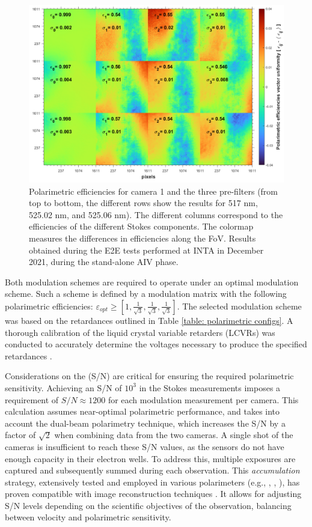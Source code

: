 \begin{figure}[t]
    \includegraphics[width=\textwidth]{figures/TuMag/Pol_efficiencies_map.png}
    \caption{Polarimetric efficiencies for camera 1 and the three pre-filters (from top to bottom, the different rows show the results for 517 nm, 525.02 nm, and 525.06 nm). The different columns correspond to the efficiencies of the different Stokes components. The colormap measures the differences in efficiencies along the FoV. Results obtained during the E2E tests performed at INTA in December 2021, during the stand-alone AIV phase. 
    \label{fig_tumag:pol eff maps}}
\end{figure}

Both modulation schemes are required to operate under an optimal modulation scheme. Such a scheme is defined by a modulation matrix with the following polarimetric efficiencies: $\varepsilon _{opt} \geqslant [1, \frac{1}{\sqrt{3}}, \frac{1}{\sqrt{3}}, \frac{1}{\sqrt{3}}]$. The selected modulation scheme was based on the retardances outlined in Table \ref{table: polarimetric configs}. A thorough calibration of the liquid crystal variable retarders (LCVRs) was conducted to accurately determine the voltages necessary to produce the specified retardances \citep{fine-tunin}.

Considerations on the (S/N) are critical for ensuring the required polarimetric sensitivity. Achieving an S/N of $10^3$ in the Stokes measurements imposes a requirement of $S/N \approx 1200$  for each modulation measurement per camera. This calculation assumes near-optimal polarimetric performance, and takes into account the dual-beam polarimetry technique, which increases the S/N by a factor of $\sqrt{2}$ when combining data from the two cameras. A single shot of the cameras is insufficient to reach these S/N values, as the sensors do not have enough capacity in their electron wells. To address this, multiple exposures are captured and subsequently summed during each observation. This \textit{accumulation} strategy, extensively tested and employed in various polarimeters (e.g., \citealt{accs1}, \citealt{accs2}, \citealt{accs3}), has proven compatible with image reconstruction techniques \citep{accs-image1, accs-image2}. It allows for adjusting S/N levels depending on the scientific objectives of the observation, balancing between velocity and polarimetric sensitivity.

